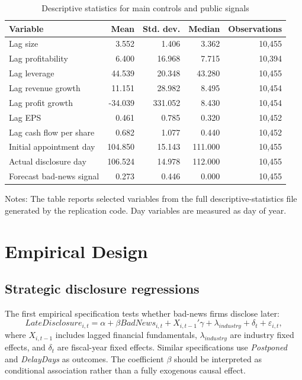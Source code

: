 \documentclass[10pt]{article}
\begin{document}
\begin{table}[H]
\centering
\caption{Descriptive statistics for main controls and public signals}
\label{tab:descstats}
\small
\begin{tabular}{lrrrr}
\toprule
Variable & Mean & Std. dev. & Median & Observations \\
\midrule
Lag size & 3.552 & 1.406 & 3.362 & 10,455 \\
Lag profitability & 6.400 & 16.968 & 7.715 & 10,394 \\
Lag leverage & 44.539 & 20.348 & 43.280 & 10,455 \\
Lag revenue growth & 11.151 & 28.982 & 8.495 & 10,454 \\
Lag profit growth & -34.039 & 331.052 & 8.430 & 10,454 \\
Lag EPS & 0.461 & 0.785 & 0.320 & 10,452 \\
Lag cash flow per share & 0.682 & 1.077 & 0.440 & 10,452 \\
Initial appointment day & 104.850 & 15.143 & 111.000 & 10,455 \\
Actual disclosure day & 106.524 & 14.978 & 112.000 & 10,455 \\
Forecast bad-news signal & 0.273 & 0.446 & 0.000 & 10,455 \\
\bottomrule
\end{tabular}
\begin{flushleft}
\footnotesize Notes: The table reports selected variables from the full descriptive-statistics file generated by the replication code. Day variables are measured as day of year.
\end{flushleft}
\end{table}

\section{Empirical Design}

\subsection{Strategic disclosure regressions}

The first empirical specification tests whether bad-news firms disclose later:
\begin{equation}
LateDisclosure_{i,t} =
\alpha + \beta BadNews_{i,t} + X_{i,t-1}'\gamma
+ \lambda_{industry} + \delta_t + \varepsilon_{i,t},
\end{equation}
where $X_{i,t-1}$ includes lagged financial fundamentals, $\lambda_{industry}$ are industry fixed effects, and $\delta_t$ are fiscal-year fixed effects. Similar specifications use \textit{Postponed} and \textit{DelayDays} as outcomes. The coefficient $\beta$ should be interpreted as conditional association rather than a fully exogenous causal effect.
\end{document}
